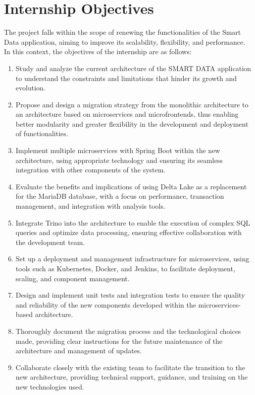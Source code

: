 \section{Internship Objectives}

The project falls within the scope of renewing the functionalities of the Smart Data application, aiming to improve its scalability, flexibility, and performance. In this context, the objectives of the internship are as follows:

\begin{enumerate}
\item Study and analyze the current architecture of the SMART DATA application to understand the constraints and limitations that hinder its growth and evolution.
\item Propose and design a migration strategy from the monolithic architecture to an architecture based on microservices and microfrontends, thus enabling better modularity and greater flexibility in the development and deployment of functionalities.
\item Implement multiple microservices with Spring Boot within the new architecture, using appropriate technology and ensuring its seamless integration with other components of the system.
\item Evaluate the benefits and implications of using Delta Lake as a replacement for the MariaDB database, with a focus on performance, transaction management, and integration with analysis tools.
\item Integrate Trino into the architecture to enable the execution of complex SQL queries and optimize data processing, ensuring effective collaboration with the development team.
\item Set up a deployment and management infrastructure for microservices, using tools such as Kubernetes, Docker, and Jenkins, to facilitate deployment, scaling, and component management.
\item Design and implement unit tests and integration tests to ensure the quality and reliability of the new components developed within the microservices-based architecture.
\item Thoroughly document the migration process and the technological choices made, providing clear instructions for the future maintenance of the architecture and management of updates.
\item Collaborate closely with the existing team to facilitate the transition to the new architecture, providing technical support, guidance, and training on the new technologies used.
\end{enumerate}

